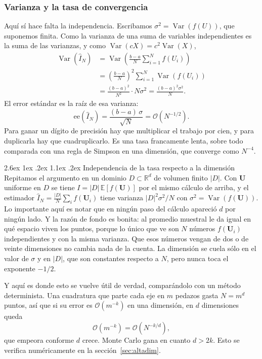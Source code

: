 \documentclass[11pt,letterpaper]{article}
\makeatletter
\renewcommand\paragraph{\@startsection{paragraph}{4}{\z@}%
  {2.6ex \@plus 1ex \@minus .2ex}%
  {1.1ex \@plus .2ex}%
  {\normalfont\normalsize\bfseries}}
\DeclareMathOperator{\Var}{Var}
\makeatother
\begin{document}
\subsubsection{Varianza y la tasa de convergencia}

Aquí sí hace falta la independencia. Escribamos
$\sigma^2 = \Var(f(U))$, que suponemos finita. Como la varianza de una suma
de variables independientes es la suma de las varianzas, y como
$\Var(cX) = c^2\Var(X)$,
\begin{align}
\Var(\hat{I}_N)
&= \Var\!\left(\frac{b-a}{N}\sum_{i=1}^{N} f(U_i)\right) \nonumber\\
&= \left(\frac{b-a}{N}\right)^{2} \sum_{i=1}^{N} \Var(f(U_i)) \nonumber\\
&= \frac{(b-a)^2}{N^2} \cdot N\sigma^2
= \frac{(b-a)^2\sigma^2}{N}.
\label{eq:varianza}
\end{align}
El error estándar es la raíz de esa varianza:
\begin{equation}
\mathrm{ee}(\hat{I}_N) = \frac{(b-a)\,\sigma}{\sqrt{N}}
= \mathcal{O}(N^{-1/2}).
\label{eq:tasa}
\end{equation}
Para ganar un dígito de precisión hay que multiplicar el trabajo por cien, y
para duplicarla hay que cuadruplicarlo. Es una tasa francamente lenta, sobre
todo comparada con una regla de Simpson en una dimensión, que converge como
$N^{-4}$.

\paragraph{Independencia de la tasa respecto a la dimensión} Repitamos el
argumento en un dominio $D \subset \mathbb{R}^d$ de volumen finito $|D|$. Con
$\mathbf{U}$ uniforme en $D$ se tiene $I = |D|\,\mathbb{E}[f(\mathbf{U})]$
por el mismo cálculo de arriba, y el estimador
$\hat{I}_N = \frac{|D|}{N}\sum_i f(\mathbf{U}_i)$ tiene varianza
$|D|^2\sigma^2/N$ con $\sigma^2 = \Var(f(\mathbf{U}))$. Lo importante aquí es
notar que en ningún paso del cálculo apareció $d$ por ningún lado. Y la razón
de fondo es bonita: al promedio muestral le da igual en qué espacio viven los
puntos, porque lo único que ve son $N$ números $f(\mathbf{U}_i)$
independientes y con la misma varianza. Que esos números vengan de dos o de
veinte dimensiones no cambia nada de la cuenta. La dimensión se cuela sólo en
el valor de $\sigma$ y en $|D|$, que son constantes respecto a $N$, pero
nunca toca el exponente $-1/2$.

Y aquí es donde esto se vuelve útil de verdad, comparándolo con un método
determinista. Una cuadratura que parte cada eje en $m$ pedazos gasta
$N = m^d$ puntos, así que si su error es $\mathcal{O}(m^{-k})$ en una
dimensión, en $d$ dimensiones queda
\begin{equation}
\mathcal{O}(m^{-k}) = \mathcal{O}(N^{-k/d}),
\end{equation}
que empeora conforme $d$ crece. Monte Carlo gana en cuanto $d > 2k$. Esto se
verifica numéricamente en la sección~\ref{sec:altadim}.
\end{document}
